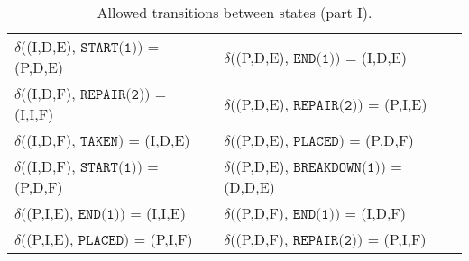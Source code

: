 \begin{table}[H]
\begin{tabular}{l|l}
    $\delta$((I,D,E), $\texttt{START(1)})$ = (P,D,E)     & $\delta$((P,D,E), $\texttt{END(1)})$ = (I,D,E)       \\
    $\delta$((I,D,F), $\texttt{REPAIR(2)})$ = (I,I,F)    & $\delta$((P,D,E), $\texttt{REPAIR(2)})$ = (P,I,E)    \\
    $\delta$((I,D,F), $\texttt{TAKEN})$ = (I,D,E)        & $\delta$((P,D,E), $\texttt{PLACED})$ = (P,D,F)       \\
    $\delta$((I,D,F), $\texttt{START(1)})$ = (P,D,F)     & $\delta$((P,D,E), $\texttt{BREAKDOWN(1)})$ = (D,D,E) \\
    $\delta$((P,I,E), $\texttt{END(1)})$ = (I,I,E)       & $\delta$((P,D,F), $\texttt{END(1)})$ = (I,D,F)       \\
    $\delta$((P,I,E), $\texttt{PLACED})$ = (P,I,F)       & $\delta$((P,D,F), $\texttt{REPAIR(2)})$ = (P,I,F)    \\
  \end{tabular}
  \caption{Allowed transitions between states (part I).}
  \label{tbl:04.02_delta_1}
\end{table}

